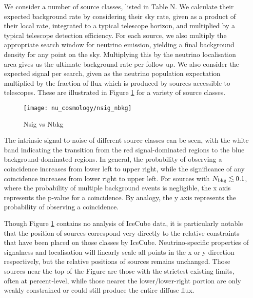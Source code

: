 We consider a number of source classes, listed in Table N. We calculate their expected background rate by considering their sky rate, given as a product of their local rate, integrated to a typical telescope horizon, and multiplied by a typical telescope detection efficiency. For each source, we also multiply the appropriate search window for neutrino emission, yielding a final background density for any point on the sky. Multiplying this by the neutrino localisation area gives us the ultimate background rate per follow-up. We also consider the expected signal per search, given as the neutrino population expectation multiplied by the fraction of flux which is produced by sources accessible to telescopes.  These are illustrated in Figure \ref{fig:nsig_nbkg} for a variety of source classes.

\begin{figure}[!ht]
	\centering \texttt{[image: nu\_cosmology/nsig\_nbkg]}
	\caption{Nsig vs Nbkg}
	\label{fig:nsig_nbkg}
\end{figure}

The intrinsic signal-to-noise of different source classes can be seen, with the white band indicating the transition from the red signal-dominated regions to the blue background-dominated regions. In general, the probability of observing a coincidence increases from lower left to upper right, while the significance of any coincidence increases from lower right to upper left. For sources with $N_{\textup{bkg}} \lesssim 0.1$, where the probability of multiple background events is negligible, the x axis represents the p-value for a coincidence. By analogy, the y axis represents the probability of observing a coincidence.

Though Figure \ref{fig:nsig_nbkg} contains no analysis of IceCube data, it is particularly notable that the position of sources correspond very directly to the relative constraints that have been placed on those classes by IceCube. Neutrino-specific properties of signalness and localisation will linearly scale all points in the x or y direction respectively, but the relative positions of sources remains unchanged. Those sources near the top of the Figure are those with the strictest existing limits, often at percent-level, while those nearer the lower/lower-right portion are only weakly constrained or could still produce the entire diffuse flux. 

